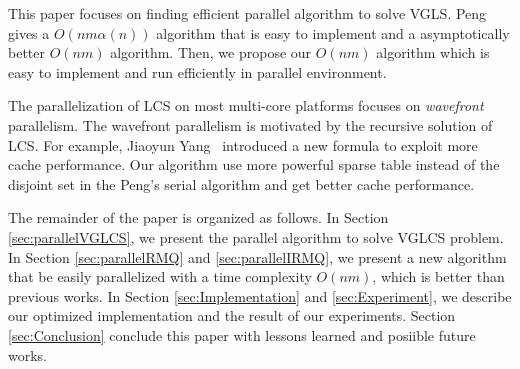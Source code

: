 This paper focuses on finding efficient parallel algorithm to solve
VGLS.  Peng~\cite{Peng2011TheLC} gives a $O(nm \alpha(n))$ algorithm
that is easy to implement and a asymptotically better $O(nm)$
algorithm.  Then, we propose our $O(nm)$ algorithm which is easy to
implement and run efficiently in parallel environment.


The parallelization of LCS on most multi-core platforms focuses on
{\em wavefront} parallelism.  The wavefront parallelism is motivated
by the recursive solution of LCS.  For example, Jiaoyun
Yang~\cite{Yang2010AnEP} introduced a new formula to exploit more
cache performance.  Our algorithm use more powerful sparse table
instead of the disjoint set in the Peng's serial algorithm and get
better cache performance.


\iffalse 在約束條件下的 LCS 中，如 \emph{fixed gap LCS } (FGLCS)要求任
兩個挑選的距離在相對應的另一個字串中相等，同時距離最大為 $k+1$，可在時
間複雜度在 $O(nm)$ 內解決，其中 $n$, $m$ 分別為兩個輸入的字串長度。我
們將在這篇論文針對 \emph{variable gap LCS} (VGLCS) 進行探討。在 VGLCS
中，對各個不同的位置提供約束限制，如目前給定兩個字串 $A =
\tt{GCGCAATG}$, $B = \tt{GCCCTAGCG}$，各自的約束限制為 $G_A = [3, 1,
  1, 2, 0, 0, 2, 1]$ 和 $G_B = [2, 0, 3, 2, 0, 1, 2, 0, 1]$，其中
$G_A(i)$ 表示當挑選第 $i$ 個位置時，與前一個挑選的位置最多差
$G_A(i)+1$，同理 $G_B(i)$；我們可以得到兩組 VGLCS 的解
$\tt{G..C..C..A}$ 和 $\tt{G..C..C..T}$，挑選的方式如圖
~\ref{fig:VGLCSex}。在 Yung-Hsing Peng ~\cite{yunghsing} 的論文已對
VGLCS 提出易於實作的 $O(nm \alpha(n))$ 和理論 $O(nm)$ 的解法。\fi


The remainder of the paper is organized as follows.  In Section
\ref{sec:parallelVGLCS}, we present the parallel algorithm to solve
VGLCS problem.  In Section \ref{sec:parallelRMQ} and
\ref{sec:parallelIRMQ}, we present a new algorithm that be easily
parallelized with a time complexity $O(nm)$, which is better than
previous works.  In Section \ref{sec:Implementation} and
\ref{sec:Experiment}, we describe our optimized implementation and the
result of our experiments. Section \ref{sec:Conclusion} conclude this
paper with lessons learned and posiible future works.

\iffalse 這一篇論文，我們將在第二 \ref{sec:parallelVGLCS} 節部分將
Yung-Hsing Peng ~\cite{yunghsing} 提出的算法進行平行化。在第三節
~\ref{sec:parallelRMQ}，在理論分析上提供易平行且時間複雜度 $O(nm)$ 的
設計。在第四節 ~\ref{sec:Implementation}，我們將藉由快取忘卻
(cache-oblivious) 技術，在實作上提供更好的效能。最後，我們總結實驗結果
與理論實務上的差異。\fi

